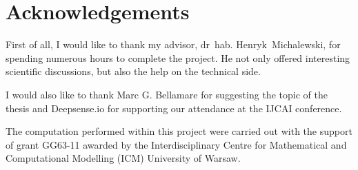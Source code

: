 \section*{Acknowledgements}
First of all, I would like to thank my advisor, dr~hab. Henryk~Michalewski, for spending numerous hours to complete the project. He not only offered interesting scientific discussions, but also the help on the technical side.

I would also like to thank Marc G. Bellamare for suggesting the topic of the thesis and Deepsense.io for supporting our attendance at the IJCAI conference.

The computation performed within this project were carried out with the support of grant GG63-11 awarded by the Interdisciplinary Centre for Mathematical and Computational Modelling (ICM) University of Warsaw.
